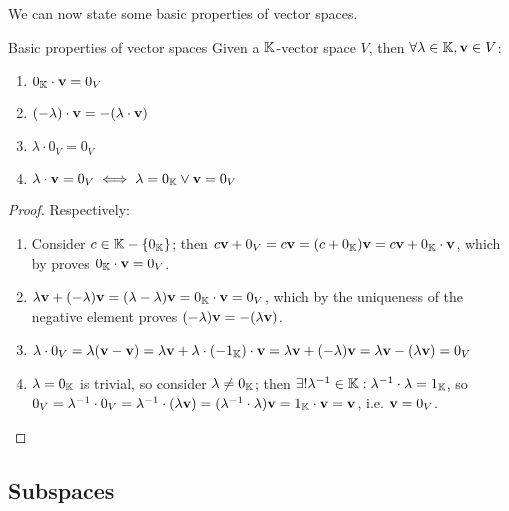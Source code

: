 We can now state some basic properties of vector spaces.

\begin{lemma}{Basic properties of vector spaces}{}
  Given a $ \mathbb{K} $-vector space $ V $, then $ \forall \lambda \in \mathbb{K} , \mathbf{v} \in V $:
  \begin{multicols}{2}
    \begin{enumerate}[label = {\alph*.}]
      \item $ 0_{\mathbb{K}} \cdot \mathbf{v} = 0_V $
      \item $ (-\lambda) \cdot \mathbf{v} = - (\lambda \cdot \mathbf{v}) $
      \item $ \lambda \cdot 0_V = 0_V $
      \item $ \lambda \cdot \mathbf{v} = 0_V \iff \lambda = 0_{\mathbb{K}} \lor \mathbf{v} = 0_V $
    \end{enumerate}
  \end{multicols}
\end{lemma}

\begin{proofbox}
  \begin{proof}
    Respectively:
    \begin{enumerate}[label = {\alph*.}]
      \item Consider $ c \in \mathbb{K} - \{0_{\mathbb{K}}\} $; then $ c \mathbf{v} + 0_V = c \mathbf{v} = (c + 0_{\mathbb{K}}) \mathbf{v} = c \mathbf{v} + 0_{\mathbb{K}} \cdot \mathbf{v} $, which by  proves $ 0_{\mathbb{K}} \cdot \mathbf{v} = 0_V $.
      \item $ \lambda \mathbf{v} + (-\lambda) \mathbf{v} = (\lambda - \lambda) \mathbf{v} = 0_{\mathbb{K}} \cdot \mathbf{v} = 0_V $, which by the uniqueness of the negative element proves $ (-\lambda) \mathbf{v} = - (\lambda \mathbf{v}) $.
      \item $ \lambda \cdot 0_V = \lambda (\mathbf{v} - \mathbf{v}) = \lambda \mathbf{v} + \lambda \cdot (-1_{\mathbb{K}}) \cdot \mathbf{v} = \lambda \mathbf{v} + (-\lambda) \mathbf{v} = \lambda \mathbf{v} - (\lambda \mathbf{v}) = 0_V $
      \item $ \lambda = 0_{\mathbb{K}} $ is trivial, so consider $ \lambda \neq 0_{\mathbb{K}} $; then $ \exists ! \lambda^{-1} \in \mathbb{K} : \lambda^{-1} \cdot \lambda = 1_{\mathbb{K}} $, so $ 0_V = \lambda^{-1} \cdot 0_V = \lambda^{-1} \cdot (\lambda \mathbf{v}) = (\lambda^{-1} \cdot \lambda) \mathbf{v} = 1_{\mathbb{K}} \cdot \mathbf{v} = \mathbf{v} $, i.e. $ \mathbf{v} = 0_V $.
    \end{enumerate}
  \end{proof}
\end{proofbox}

\subsection{Subspaces}

